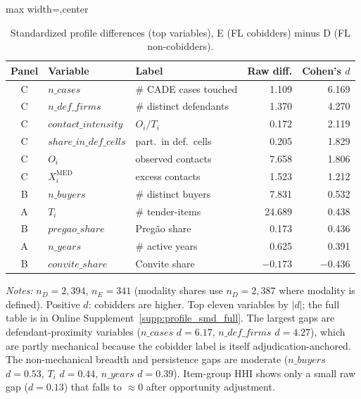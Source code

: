 \begin{table}[htbp]
\centering
\begin{adjustbox}{max width=\textwidth,center}
\begin{threeparttable}
\caption{Standardized profile differences (top variables),
E (FL cobidders) minus D (FL non-cobidders).}
\label{tab:profile_smd_submission}
\scriptsize
\begin{tabular}{cllr r}
\toprule
Panel & Variable & Label & Raw diff. & Cohen's $d$ \\
\midrule
C & $n\_cases$ & \# CADE cases touched & 1.109 & 6.169 \\
C & $n\_def\_firms$ & \# distinct defendants & 1.370 & 4.270 \\
C & $contact\_intensity$ & $O_i/T_i$ & 0.172 & 2.119 \\
C & $share\_in\_def\_cells$ & part.\ in def.\ cells & 0.205 & 1.829 \\
C & $O_i$ & observed contacts & 7.658 & 1.806 \\
C & $X_i^{\mathrm{MED}}$ & excess contacts & 1.523 & 1.212 \\
B & $n\_buyers$ & \# distinct buyers & 7.831 & 0.532 \\
A & $T_i$ & \# tender-items & 24.689 & 0.438 \\
B & $pregao\_share$ & Preg\~ao share & 0.173 & 0.436 \\
A & $n\_years$ & \# active years & 0.625 & 0.391 \\
B & $convite\_share$ & Convite share & $-0.173$ & $-0.436$ \\
\bottomrule
\end{tabular}
\begin{tablenotes}[flushleft]
\scriptsize
\item \textit{Notes:} $n_D=2{,}394$, $n_E=341$ (modality shares use
$n_D=2{,}387$ where modality is defined). Positive $d$: cobidders
are higher. Top eleven variables by $|d|$; the full table
is in Online Supplement~\ref{supp:profile_smd_full}. The largest gaps are
defendant-proximity variables ($n\_cases$ $d=6.17$, $n\_def\_firms$
$d=4.27$), which are partly mechanical because the cobidder label is
itself adjudication-anchored. The non-mechanical breadth and
persistence gaps are moderate ($n\_buyers$ $d=0.53$, $T_i$ $d=0.44$,
$n\_years$ $d=0.39$). Item-group HHI shows only a small raw gap
($d=0.13$) that falls to $\approx 0$ after opportunity adjustment.
\end{tablenotes}
\end{threeparttable}
\end{adjustbox}
\end{table}
